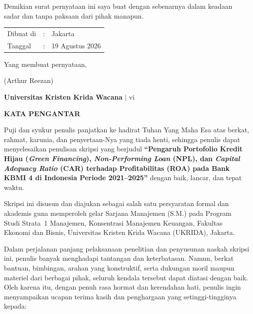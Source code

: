 \documentclass[12pt,a4paper]{article}
\newcommand{\ukrida}{Universitas Kristen Krida Wacana}
\newcommand{\nahamahasiswa}{Arthur Reezan}
\numberwithin{equation}{section}
\begin{document}
\vspace{0.3cm}
\noindent
Demikian surat pernyataan ini saya buat dengan sebenarnya dalam keadaan sadar dan tanpa paksaan dari pihak manapun.

\vspace{0.8cm}
\noindent
\begin{tabular}{lll}
  Dibuat di & : & Jakarta \\
  Tanggal   & : & 19 Agustus 2026 \\
\end{tabular}

\vspace{0.4cm}
\noindent Yang membuat pernyataan,

\vspace{2.2cm}
\noindent (\nahamahasiswa)

\vfill
\begin{flushright}
  \footnotesize\textbf{\ukrida} $|$ vi
\end{flushright}

\newpage
\thispagestyle{frontmatter}
\begin{center}
  {\large\bfseries KATA PENGANTAR}
\end{center}

\vspace{0.5cm}
\noindent
Puji dan syukur penulis panjatkan ke hadirat Tuhan Yang Maha Esa atas berkat, rahmat, karunia, dan penyertaan-Nya yang tiada henti, sehingga penulis dapat menyelesaikan penulisan skripsi yang berjudul \textbf{``Pengaruh Portofolio Kredit Hijau (\emph{Green Financing}), \emph{Non-Performing Loan} (NPL), dan \emph{Capital Adequacy Ratio} (CAR) terhadap Profitabilitas (ROA) pada Bank KBMI 4 di Indonesia Periode 2021--2025''} dengan baik, lancar, dan tepat waktu.

\noindent
Skripsi ini disusun dan diajukan sebagai salah satu persyaratan formal dan akademis guna memperoleh gelar Sarjana Manajemen (S.M.) pada Program Studi Strata~1 Manajemen, Konsentrasi Manajemen Keuangan, Fakultas Ekonomi dan Bisnis, Universitas Kristen Krida Wacana (UKRIDA), Jakarta.

\noindent
Dalam perjalanan panjang pelaksanaan penelitian dan penyusunan naskah skripsi ini, penulis banyak menghadapi tantangan dan keterbatasan. Namun, berkat bantuan, bimbingan, arahan yang konstruktif, serta dukungan moril maupun materiel dari berbagai pihak, seluruh kendala tersebut dapat diatasi dengan baik. Oleh karena itu, dengan penuh rasa hormat dan kerendahan hati, penulis ingin menyampaikan ucapan terima kasih dan penghargaan yang setinggi-tingginya kepada:
\end{document}
